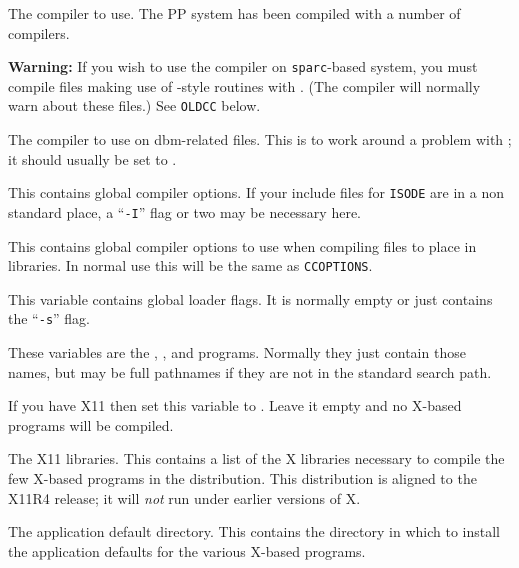 \begin{describe}
\item[\verb|CC|:] The compiler to use. The PP system has been
compiled with a number of  compilers. 

{\bf Warning: } If you wish to use the  compiler on
\verb|sparc|-based system, you must compile files making use of
-style routines with .  (The compiler will normally warn about
these files.) See \verb|OLDCC| below.

\item[\verb|OLDCC|:] The  compiler to use on dbm-related
files. This is to work around a problem with ; it should usually
be set to .

\item[\verb|CCOPTIONS|:] This contains global 
compiler options. If your include files for \verb|ISODE| are in a non
standard place, a ``\verb|-I|'' flag or two may be necessary here.

\item[\verb|LIBCCOPTIONS|:] This contains global 
compiler options to use when compiling files to place in libraries. In
normal use this will be the same as \verb|CCOPTIONS|.

\item[\verb|LDOPTIONS|:] This variable contains
global loader flags. It is normally empty or just contains the
``\verb|-s|'' flag.

\item[\verb|PEPY|/\verb|POSY|/\verb|ROSY|/\verb|PEPSY|:]
  
These variables are the
, ,  and  programs. Normally
they just contain those names, but may be full pathnames if they are
not in the standard search path.

\item[\verb|X11|:] If you have X11 then set this variable
to . Leave it empty and no X-based programs will be compiled.

\item[\verb|LIBX|:] The X11 libraries. This contains a
list of the X libraries necessary to compile the few X-based programs
in the distribution. This distribution is aligned to the X11R4
release; it will {\em not} run under earlier versions of X.

\item[\verb|APPDEFAULTS|:] The application default
directory. This contains the directory in which to install the
application defaults for the various X-based programs.


\end{describe}
